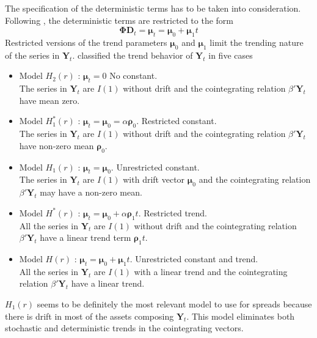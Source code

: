 \documentclass[11pt,a4,twosided,singlespacing,titlepagenumber=on]{scrreprt}
\numberwithin{equation}{chapter} %
\theoremstyle{remark}
\newcommand{\matr}[1]{\mathbf{#1}}
\begin{document}
The specification of the deterministic terms has to be taken into consideration. Following \cite{johansen1995}, the deterministic terms are restricted to the form
\begin{equation}
\matr{\Phi} \matr{D}_t = \matr{\mu}_t = \matr{\mu}_0 + \matr{\mu}_1 t
\end{equation}
Restricted versions of the trend parameters $\matr{\mu}_0$ and $\matr{\mu}_1$ limit the trending nature of the series in $\matr{Y}_t$. \cite{johansen1995} classified the trend behavior of $\matr{Y}_t$ in five cases
\begin{itemize}
\item Model $H_2(r)$ : $\matr{\mu}_t = 0$ No constant. \\
The series in $\matr{Y}_t$ are $I(1)$ without drift and the cointegrating relation $\beta' \matr{Y}_t$ have mean zero.
\item Model $H_1^*(r)$ : $\matr{\mu}_t = \matr{\mu}_0 = \alpha \matr{\rho}_0$. Restricted constant. \\ The series in $\matr{Y}_t$ are $I(1)$ without drift and the cointegrating relation $\beta' \matr{Y}_t$ have non-zero mean $\matr{\rho}_0$.
\item Model $H_1(r)$ : $\matr{\mu}_t = \matr{\mu}_0$. Unrestricted constant. \\ The series in $\matr{Y}_t$ are $I(1)$ with drift vector $\matr{\mu}_0$ and the cointegrating relation $\beta' \matr{Y}_t$ may have a non-zero mean.
\item Model $H^*(r)$ : $\matr{\mu}_t = \matr{\mu}_0 + \alpha \matr{\rho}_1 t$. Restricted trend. \\ All the series in $\matr{Y}_t$ are $I(1)$ without drift and the cointegrating relation $\beta' \matr{Y}_t$ have a linear trend term $\matr{\rho}_1 t$.
\item Model $H(r)$ : $\matr{\mu}_t = \matr{\mu}_0 + \matr{\mu}_1 t$. Unrestricted constant and trend. \\
All the series in $\matr{Y}_t$ are $I(1)$ with a linear trend and the cointegrating relation $\beta' \matr{Y}_t$ have a linear trend.
\end{itemize}
$H_1(r)$ seems to be definitely the most relevant model to use for spreads because there is drift in most of the assets composing $\matr{Y}_t$. This model eliminates both stochastic and deterministic trends in the cointegrating vectors.
\end{document}
